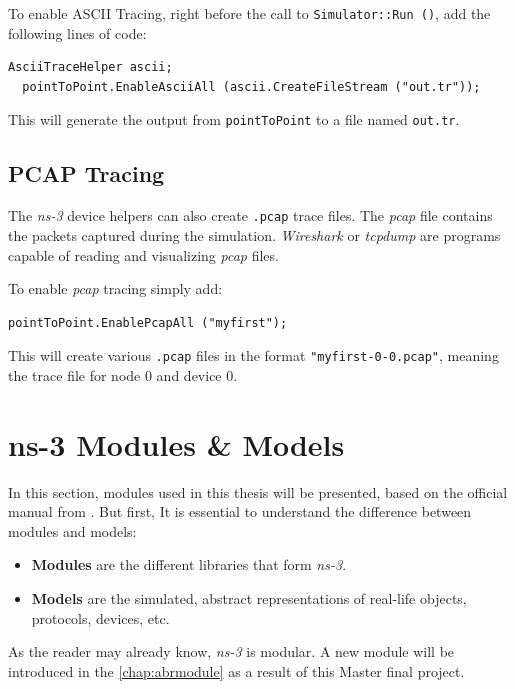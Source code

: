 To enable ASCII Tracing, right before the call to \texttt{Simulator::Run ()}, add the following lines
of code:

\begin{lstlisting}[escapechar=@, language=myC++,caption={ASCII tracing}, captionpos=b]
  AsciiTraceHelper ascii;
  pointToPoint.EnableAsciiAll (ascii.CreateFileStream ("out.tr"));
\end{lstlisting}

This will generate the output from \texttt{pointToPoint} to a file named \texttt{out.tr}.

\subsection{PCAP Tracing}
The \textit{ns-3} device helpers can also create \texttt{.pcap} trace files. The \textit{pcap} file
contains the packets captured during the simulation. \textit{Wireshark} or \textit{tcpdump} 
are programs capable of reading and visualizing \textit{pcap} files.

To enable \textit{pcap} tracing simply add:
\begin{lstlisting}[escapechar=@, language=myC++,caption={PCAP tracing}, captionpos=b]
  pointToPoint.EnablePcapAll ("myfirst");
\end{lstlisting}

This will create various \texttt{.pcap} files in the format \texttt{"myfirst-0-0.pcap"}, meaning
the trace file for node 0 and device 0.

\section{ns-3 Modules \& Models}
In this section, modules used in this thesis will be presented, based on the official
manual from \cite{ns3}. But first, It is 
essential to understand the difference between modules and models:

\begin{itemize}[itemsep=0pt, topsep=0pt]
  \item \textbf{Modules} are the different libraries that form \textit{ns-3}.
  \item \textbf{Models} are the simulated, abstract representations of real-life objects,
  protocols, devices, etc.
\end{itemize}

As the reader may already know, \textit{ns-3} is modular. A new module will be introduced in 
the \autoref{chap:abrmodule} as a result of this Master final project.

